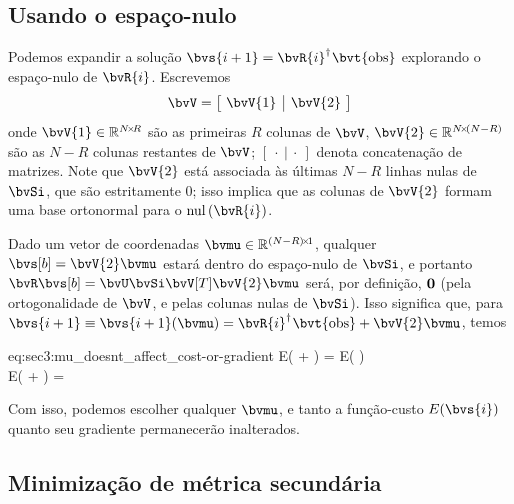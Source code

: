 \subsection{Usando o espaço-nulo}
\label{subsec:sec3:null-space_exploitation}

Podemos expandir a solução $\bvs{i+1} = \pinv{\bvR{i}} \bvt{\obs}$ explorando o espaço-nulo de $\bvR{i}$. Escrevemos
\begin{equation}
	\bvV = \left[\begin{array}{c|c}
		\!\bvV{1} & \bvV{2}\!
	\end{array}\right]
\end{equation}
onde $\bvV{1}\in \re^{\sz{N}{R}}$ são as primeiras $R$ colunas de $\bvV$, $\bvV{2} \in \re^{\sz{N}{(N-R)}}$ são as $N-R$ colunas restantes de $\bvV$; $[~\cdot~|~\cdot~]$ denota concatenação de matrizes. Note que $\bvV{2}$ está associada às últimas $N-R$ linhas nulas de $\bvSi$, que são estritamente $0$; isso implica que as colunas de $\bvV{2}$ formam uma base ortonormal para o $\nul{\bvR{i}}$.

Dado um vetor de coordenadas $\bvmu \in \re^{\sz{(N-R)}{1}}$, qualquer $\bvs[b] = \bvV{2} \bvmu$ estará dentro do espaço-nulo de $\bvSi$, e portanto $\bvR \bvs[b] = \bvU \bvSi \bvV[T] \bvV{2} \bvmu$ será, por definição, $\bv0$ (pela ortogonalidade de $\bvV$, e pelas colunas nulas de $\bvSi$). Isso significa que, para $\bvs{i+1} \equiv \bvs{i+1}(\bvmu) = \pinv{\bvR{i}} \bvt{\obs} + \bvV{2} \bvmu$, temos
\begin{subgather}{eq:sec3:mu_doesnt_affect_cost-or-gradient}
		E( \bvt{\obs} +  \bvmu) = E( \bvt{\obs}) \\
		\nabla E( \bvt{\obs} +  \bvmu) = 
\end{subgather}

Com isso, podemos escolher qualquer $\bvmu$, e tanto a função-custo $E(\bvs{i})$ quanto seu gradiente permanecerão inalterados.

\subsection{Minimização de métrica secundária}
\label{subsec:sec2:minim_secundaria}


